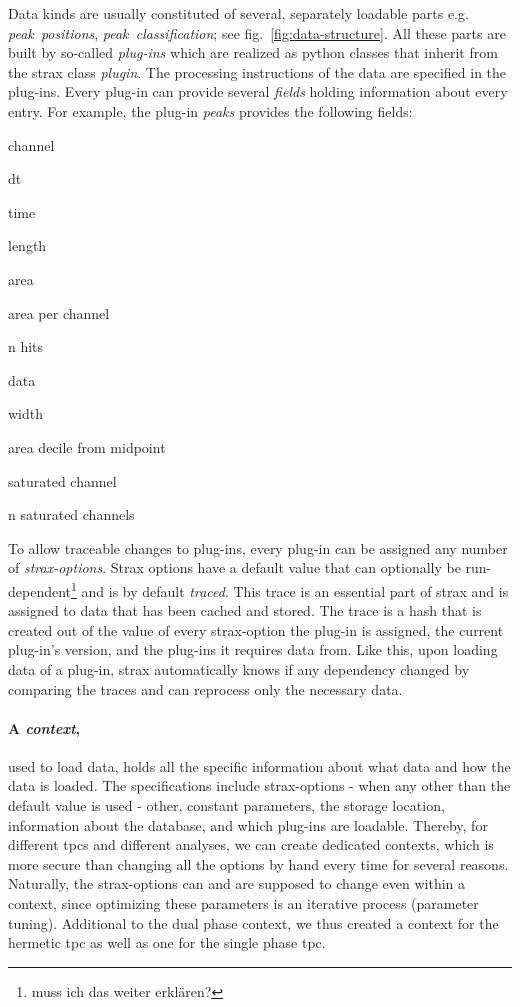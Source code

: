 Data kinds are usually constituted of several, separately loadable parts e.g. \emph{peak~positions}, \emph{peak~classification}; see fig.~\ref{fig:data-structure}.
All these parts are built by so-called \emph{plug-ins} which are realized as python classes that inherit from the strax class \emph{plugin}.
The processing instructions of the data are specified in the plug-ins.
Every plug-in can provide several \emph{fields} holding information about every entry.
For example, the plug-in \emph{peaks} provides the following fields:
\begin{AutoMultiColItemize}
        \item{channel}
        \item{dt}
        \item{time}
        \item{length}
        \item{area}
        \item{area per channel}
        \item{n hits}
        \item{data}
        \item{width}
        \item{area decile from midpoint}
        \item{saturated channel}
        \item{n saturated channels}
\end{AutoMultiColItemize}
To allow traceable changes to plug-ins, every plug-in can be assigned any number of \emph{strax-options}.
Strax options have a default value that can optionally be run-dependent\footnote{muss ich das weiter erklären?} and is by default \emph{traced}.
This trace is an essential part of strax and is assigned to data that has been cached and stored.
The trace is a hash that is created out of the value of every strax-option the plug-in is assigned, the current plug-in's version, and the plug-ins it requires data from.
Like this, upon loading data of a plug-in, strax automatically knows if any dependency changed by comparing the traces and can reprocess only the necessary data.

\paragraph{A \emph{context},} used to load data, holds all the specific information about what data and how the data is loaded.
The specifications include strax-options - when any other than the default value is used - other, constant parameters, the storage location, information about the database, and which plug-ins are loadable.
Thereby, for different \glspl{tpc} and different analyses, we can create dedicated contexts, which is more secure than changing all the options by hand every time for several reasons.
Naturally, the strax-options can and are supposed to change even within a context, since optimizing these parameters is an iterative process (parameter tuning).
Additional to the dual phase context, we thus created a context for the hermetic \gls{tpc} as well as one for the single phase \gls{tpc}.

